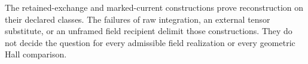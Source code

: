 The retained-exchange and marked-current constructions prove
reconstruction on their declared classes. The failures of raw
integration, an external tensor substitute, or an unframed field
recipient delimit those constructions. They do not decide the
question for every admissible field realization or every geometric
Hall comparison.

